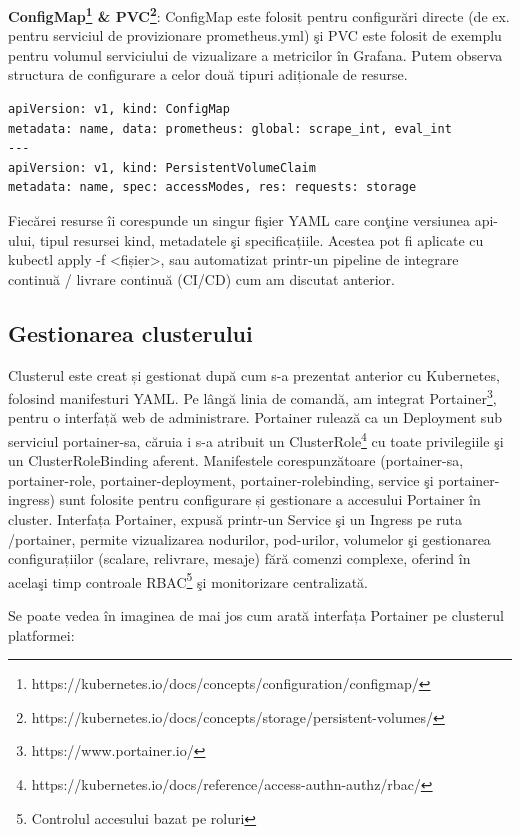 \textbf{ConfigMap\footnote{https://kubernetes.io/docs/concepts/configuration/configmap/} \& 
PVC\footnote{https://kubernetes.io/docs/concepts/storage/persistent-volumes/}}:
ConfigMap este folosit pentru configurări directe (de ex. pentru serviciul de provizionare
prometheus.yml) şi PVC este folosit de exemplu pentru volumul serviciului de vizualizare a metricilor în
Grafana. Putem observa structura de configurare a celor două tipuri adiționale de resurse.
  \begin{lstlisting}[style=yamlstyle]
apiVersion: v1, kind: ConfigMap
metadata: name, data: prometheus: global: scrape_int, eval_int
---
apiVersion: v1, kind: PersistentVolumeClaim
metadata: name, spec: accessModes, res: requests: storage
\end{lstlisting}

Fiecărei resurse îi corespunde un singur fişier YAML care conţine versiunea api-ului, tipul resursei kind,
metadatele şi specificațiile. Acestea pot fi aplicate cu kubectl apply -f <fișier>, sau
automatizat printr-un pipeline de integrare continuă / livrare continuă (CI/CD) cum am discutat anterior.

\subsection{Gestionarea clusterului}

Clusterul este creat și gestionat după cum s-a prezentat anterior cu Kubernetes, folosind manifesturi YAML.
Pe lângă linia de comandă, am integrat Portainer\footnote{https://www.portainer.io/},
pentru o interfață web de administrare. Portainer rulează ca un Deployment sub
serviciul portainer-sa, căruia i s-a atribuit un ClusterRole\footnote{https://kubernetes.io/docs/reference/access-authn-authz/rbac/}
cu toate privilegiile şi un ClusterRoleBinding aferent. Manifestele corespunzătoare (portainer-sa,
portainer-role, portainer-deployment, portainer-rolebinding,
service şi portainer-ingress) sunt folosite pentru configurare și
gestionare a accesului Portainer în cluster. Interfața Portainer, expusă printr-un Service
şi un Ingress pe ruta /portainer, permite vizualizarea nodurilor, pod-urilor, volumelor şi
gestionarea configurațiilor (scalare, relivrare, mesaje) fără comenzi complexe, oferind
în acelaşi timp controale RBAC\footnote{Controlul accesului bazat pe roluri} şi monitorizare centralizată.

Se poate vedea în imaginea de mai jos cum arată interfața Portainer pe clusterul platformei:

